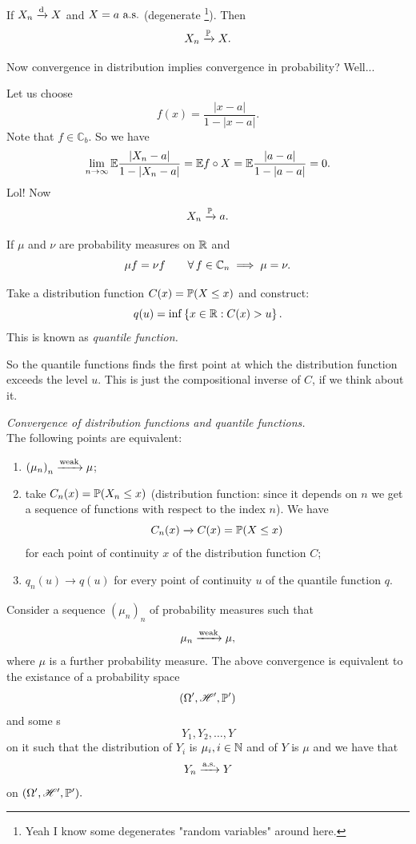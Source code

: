 \documentclass{report}
\begin{document}
\begin{remark}
	If $X_n\xrightarrow[]{\text{d}} X$ and $X=a\text{ a.s.}$ (degenerate \rv\footnote{Yeah I know some degenerates "random variables" around here.}). Then
	\[X_n\xrightarrow[]{\mathbb{P}} X.\]
\end{remark}
Now convergence in distribution implies convergence in probability? Well...
\begin{fancyproof}
	Let us choose
	\[f(x)=\frac{|x-a|}{1-|x-a|}.\]
	Note that $f\in\mathbb{C}_{b}$. So we have
	\[\lim_{n\to\infty}\mathbb{E}\frac{|X_n-a|}{1-|X_n-a|}=\mathbb{E} f\circ X=\mathbb{E}\frac{|a-a|}{1-|a-a|}=0.\]
	Lol! Now
	\[X_n\xrightarrow[]{\mathbb{P}} a.\]
\end{fancyproof}
\begin{proposition}
	If $\mu$ and $\nu$ are probability measures on $\mathbb{R}$ and 
	\[\mu f=\nu f\qquad\forall\, f\in\mathbb{C}_{n}\implies\mu=\nu.\]
\end{proposition}
\begin{definition}
	Take a distribution function $C(x)=\mathbb{P}(X\leq x)$ and construct:
	\[q(u)=\inf\left\{x\in\mathbb{R}:C(x)>u\right\}.\]
	This is known as \emph{quantile function.}
\end{definition}
So the quantile functions finds the first point at which the distribution function exceeds the level $u$. This is just the compositional inverse of $C$, if we think about it.
\begin{proposition}
	\emph{Convergence of distribution functions and quantile functions.}\\
	The following points are equivalent:
	\begin{enumerate}[\circnum]
		\item ${(\mu_n)}_{n}\xrightarrow[]{\mathrm{weak}}\mu$;
		\item take $C_n(x)=\mathbb{P}(X_n\leq x)$ (distribution function: since it depends on $n$ we get a sequence of functions with respect to the index $n$). We have 
		\[C_n(x)\xrightarrow[]{}C(x)=\mathbb{P}(X\leq x)\]
		for each point of continuity $x$ of the distribution function $C$;
		\item $q_n(u)\xrightarrow[]{}q(u)$ for every point of continuity $u$ of the quantile function $q$.
	\end{enumerate}
\end{proposition}
\begin{theorem}
	Consider a sequence ${(\mu_{n})}_{n}$ of probability measures such that 
	\[\mu_n\xrightarrow[]{\mathrm{weak}}\mu,\]
	where $\mu$ is a further probability measure. The above convergence is equivalent to the existance of a probability space
	\[(\Omega',\mathscr{H}',\mathbb{P}')\]
	and some \rv s
	\[Y_1,Y_2,\ldots,Y\]
	on it such that the distribution of $Y_i$ is $\mu_i,i\in\mathbb{N}$ and of $Y$ is $\mu$ and we have that
	\[Y_n\xrightarrow[]{\text{a.s.}} Y\]
	on $(\Omega',\mathscr{H}',\mathbb{P}').$
\end{theorem}
\end{document}
